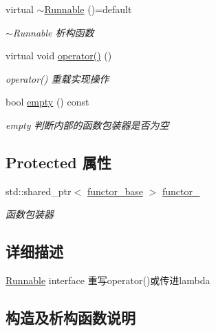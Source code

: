\begin{DoxyCompactItemize}
\mbox{\label{classRunnable_a08557328273d2dfd3425507b1f972fcb}} 
virtual \hyperlink{classRunnable_a08557328273d2dfd3425507b1f972fcb}{$\sim$\+Runnable} ()=default
\begin{DoxyCompactList}\small\item\em $\sim$\+Runnable 析构函数 \end{DoxyCompactList}\item 
\mbox{\label{classRunnable_a38bf849dab4bbb86fc5bc6e7aff383e0}} 
virtual void \hyperlink{classRunnable_a38bf849dab4bbb86fc5bc6e7aff383e0}{operator()} ()
\begin{DoxyCompactList}\small\item\em operator() 重载实现操作 \end{DoxyCompactList}\item 
bool \hyperlink{classRunnable_a3abba14a5cf19709cef2d299ee68acae}{empty} () const
\begin{DoxyCompactList}\small\item\em empty 判断内部的函数包装器是否为空 \end{DoxyCompactList}\end{DoxyCompactItemize}
\subsection*{Protected 属性}
\begin{DoxyCompactItemize}
\item 
\mbox{\label{classRunnable_a9bb8a251d9b7db3c422c576e994382f6}} 
std\+::shared\+\_\+ptr$<$ \hyperlink{structRunnable_1_1functor__base}{functor\+\_\+base} $>$ \hyperlink{classRunnable_a9bb8a251d9b7db3c422c576e994382f6}{functor\+\_\+}
\begin{DoxyCompactList}\small\item\em 函数包装器 \end{DoxyCompactList}\end{DoxyCompactItemize}


\subsection{详细描述}
\hyperlink{classRunnable}{Runnable} interface 重写operator()或传进lambda 

\subsection{构造及析构函数说明}
\mbox{\label{classRunnable_ab052afa8b53dd1e7c28e978962839446}} 
